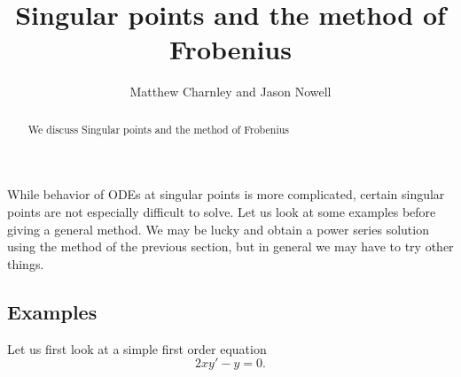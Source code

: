 \documentclass{ximera}
\title{Singular points and the method of Frobenius}
\author{Matthew Charnley and Jason Nowell}
\begin{document}
\begin{abstract}
    We discuss Singular points and the method of Frobenius
\end{abstract}
\maketitle


\label{frobenius:section}


 
While behavior of ODEs at singular points is more complicated, certain singular points are not especially difficult to solve.  Let us look at some examples before giving a general method.  We may be lucky and obtain a power series solution using the method of the previous section, but in general we may have to try other things.

\subsection{Examples}

\begin{example}
    Let us first look at a simple first order equation 
    \begin{equation*}
        2 x y' - y = 0 .
    \end{equation*}
\end{example}
\end{document}
